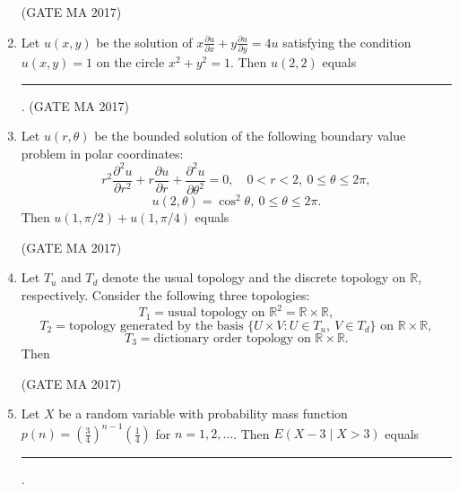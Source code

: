 \documentclass[journal,12pt,onecolumn]{IEEEtran}
\theoremstyle{remark}
\begin{document}
\begin{enumerate}
\begin{enumerate}
\end{enumerate}
\hfill (GATE MA 2017)
\item
Let $u(x, y)$ be the solution of $x \frac{\partial u}{\partial x} + y \frac{\partial u}{\partial y} = 4u$ satisfying the condition $u(x, y) = 1$ on the circle $x^2 + y^2 = 1$. Then $u(2,2)$ equals \rule{1.5cm}{0.4pt}.
\hfill (GATE MA 2017)
\item
Let $u(r, \theta)$ be the bounded solution of the following boundary value problem in polar coordinates:
$$
r^{2} \frac{\partial^{2} u}{\partial r^{2}} + r \frac{\partial u}{\partial r} + \frac{\partial^{2} u}{\partial \theta^{2}} = 0,\quad 0 < r < 2,\ 0 \leq \theta \leq 2\pi,
$$
$$
u(2, \theta) = \cos^{2} \theta,\ 0 \leq \theta \leq 2\pi.
$$
Then $u(1, \pi / 2) + u(1, \pi / 4)$ equals
\begin{enumerate}
\end{enumerate}
\hfill (GATE MA 2017)
\item
Let $T_u$ and $T_d$ denote the usual topology and the discrete topology on $\mathbb{R}$, respectively. Consider the following three topologies:
$$
T_1 = \text{usual topology on }\mathbb{R}^{2} = \mathbb{R} \times \mathbb{R},
$$
$$
T_2 = \text{topology generated by the basis } \{U \times V : U \in T_u,\ V \in T_d \} \text{ on } \mathbb{R} \times \mathbb{R},
$$
$$
T_3 = \text{dictionary order topology on } \mathbb{R} \times \mathbb{R}.
$$
Then
\begin{enumerate}
\end{enumerate}
\hfill (GATE MA 2017)
\item
Let $X$ be a random variable with probability mass function $p(n) = \left(\frac{3}{4}\right)^{n-1} \left(\frac{1}{4}\right)$ for $n = 1, 2,\ldots$. Then $E(X-3 \mid X>3)$ equals \rule{1.5cm}{0.4pt}.

\end{enumerate}
\end{document}

